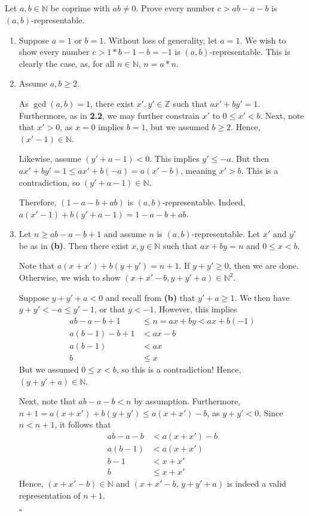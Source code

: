 \documentclass{article}
\newcommand{\N}{\mathbb{N}}
\newcommand{\Z}{\mathbb{Z}}
\begin{document}
\subsection{} %
  Let $a,b\in\N$ be coprime with $ab\ne0$. Prove every number $c>ab-a-b$ is
  $(a,b)$-representable.
  \begin{enumerate}[label=\textbf{(\alph*)}]
    \item{
      Suppose $a=1$ or $b=1$. Without loss of generality, let $a=1$. We wish to
      show every number $c>1*b-1-b=-1$ is $(a,b)$-representable. This is clearly
      the case, as, for all $n\in\N$, $n=a*n$.
    }
    \item{
      Assume $a,b\geq2$.

      As $\gcd(a,b)=1$, there exist $x',y'\in\Z$ such that
      $ax'+by'=1$. Furthermore, as in \textbf{2.2}, we may further constrain
      $x'$ to $0\leq x'<b$. Next, note that $x'>0$, as $x=0$ implies $b=1$, but
      we assumed $b\geq2$. Hence, $(x'-1)\in\N$.

      Likewise, assume $(y'+a-1)<0$. This implies $y'\leq -a$. But then $ax'+by'
      =1\leq ax'+b(-a)=a(x'-b)$, meaning $x'>b$. This is a contradiction, so
      $(y'+a-1)\in\N$.

      Therefore, $(1-a-b+ab)$ is $(a,b)$-representable. Indeed, $a(x'-1)+b(y'+a-
      1)=1-a-b+ab$.
    }
    \item{
      Let $n\geq ab-a-b+1$ and assume $n$ is $(a,b)$-representable. Let $x'$
      and $y'$ be as in \textbf{(b)}. Then there exist $x,y\in\N$ such that $ax+
      by=n$ and $0\leq x<b$.

      Note that $a(x+x')+b(y+y')=n+1$. If $y+y'\geq0$, then we are done.
      Otherwise, we wish to show $(x+x'-b,y+y'+a)\in\N^2$.

      Suppose $y+y'+a<0$ and recall from \textbf{(b)} that $y'+a\geq1$. We then
      have $y+y'<-a\leq y'-1$, or that $y<-1$. However, this implies
      \begin{align*}
          ab-a-b+1   &\leq n = ax+by < ax+b(-1)\\
          a(b-1)-b+1 &< ax-b\\
          a(b-1)     &< ax\\
          b          &\leq x
      \end{align*}
      But we assumed $0\leq x<b$, so this is a contradiction! Hence, $(y+y'+a)
      \in\N$.

      Next, note that $ab-a-b<n$ by assumption. Furthermore, $n+1=a(x+x')+b(y+
      y')\leq a(x+x')-b$, as $y+y'<0$. Since $n<n+1$, it follows that
      \begin{align*}
        ab-a-b   &< a(x+x')-b\\
        a(b-1)   &< a(x+x')\\
        b-1      &< x+x'\\
        b        &\leq x+x'
      \end{align*}
      Hence, $(x+x'-b)\in\N$ and $(x+x'-b,\,y+y'+a)$ is indeed a valid
      representation of $n+1$.
    }
    \hfill $\square$
  \end{enumerate}
\end{document}
